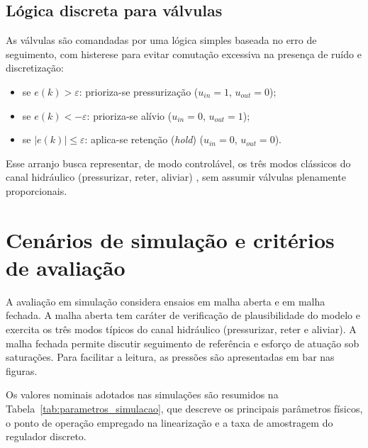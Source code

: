 \documentclass[a4paper]{ifacconf}
\begin{document}
\subsection{Lógica discreta para válvulas}
As válvulas são comandadas por uma lógica simples baseada no erro de seguimento, com histerese para evitar comutação excessiva na presença de ruído e discretização:
\begin{itemize}
   \item se $e(k)>\varepsilon$: prioriza-se pressurização ($u_{in}=1$, $u_{out}=0$);
   \item se $e(k)<-\varepsilon$: prioriza-se alívio ($u_{in}=0$, $u_{out}=1$);
   \item se $|e(k)|\le \varepsilon$: aplica-se retenção (\textit{hold}) ($u_{in}=0$, $u_{out}=0$).
\end{itemize}
Esse arranjo busca representar, de modo controlável, os três modos clássicos do canal hidráulico (pressurizar, reter, aliviar) \cite{Konrad2014}, sem assumir válvulas plenamente proporcionais.

\section{Cenários de simulação e critérios de avaliação}
\label{sec:simulacao}
A avaliação em simulação considera ensaios em malha aberta e em malha fechada. A malha aberta tem caráter de verificação de plausibilidade do modelo e exercita os três modos típicos do canal hidráulico (pressurizar, reter e aliviar). A malha fechada permite discutir seguimento de referência e esforço de atuação sob saturações. Para facilitar a leitura, as pressões são apresentadas em $\mathrm{bar}$ nas figuras.

Os valores nominais adotados nas simulações são resumidos na Tabela~\ref{tab:parametros_simulacao}, que descreve os principais parâmetros físicos, o ponto de operação empregado na linearização e a taxa de amostragem do regulador discreto.
\end{document}
